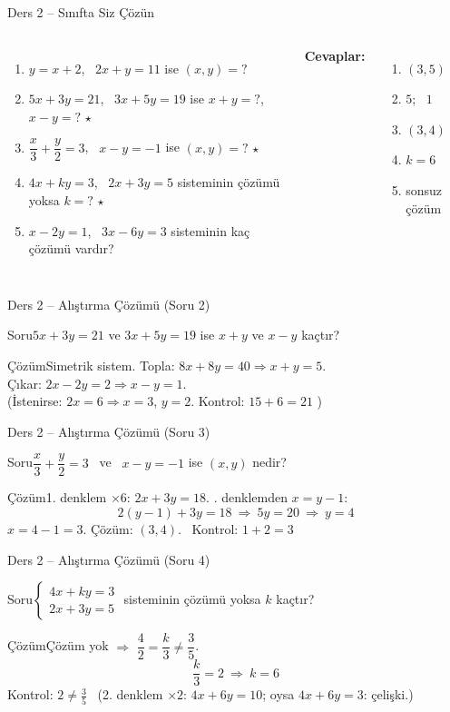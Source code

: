 \documentclass[aspectratio=169,11pt]{beamer}
\newcommand{\soru}[3]{%
\begin{frame}{#1}
  \begin{block}{Soru}\large #2\end{block}
  \pause
  \begin{exampleblock}{Çözüm}\large #3\end{exampleblock}
\end{frame}}
\begin{document}
\begin{frame}{Ders 2 -- Sınıfta Siz Çözün}
\begin{columns}[t]
\begin{enumerate}
\item \(y=x+2\), \ \(2x+y=11\) ise \((x,y)=?\)
\item \(5x+3y=21\), \ \(3x+5y=19\) ise \(x+y=?\), \ \(x-y=?\) \(\star\)
\item \(\dfrac{x}{3}+\dfrac{y}{2}=3\), \ \(x-y=-1\) ise \((x,y)=?\) \(\star\)
\item \(4x+ky=3\), \ \(2x+3y=5\) sisteminin çözümü yoksa \(k=?\) \(\star\)
\item \(x-2y=1\), \ \(3x-6y=3\) sisteminin kaç çözümü vardır?
\end{enumerate}
\pause
\textbf{Cevaplar:}
\begin{enumerate}
\item \((3,5)\)
\item \(5\); \ \(1\)
\item \((3,4)\)
\item \(k=6\)
\item sonsuz çözüm
\end{enumerate}
\end{columns}
\vspace{4pt}{\footnotesize \(\star\) işaretli soruların adım adım çözümü sonraki slaytlardadır.}
\end{frame}

\soru{Ders 2 -- Alıştırma Çözümü (Soru 2)}
{\(5x+3y=21\) ve \(3x+5y=19\) ise \(x+y\) ve \(x-y\) kaçtır?}
{Simetrik sistem. Topla: \(8x+8y=40\Rightarrow x+y=5\).\\[3pt]
Çıkar: \(2x-2y=2\Rightarrow x-y=1\).\\[3pt]
(İstenirse: \(2x=6\Rightarrow x=3\), \(y=2\). Kontrol: \(15+6=21\) \checkmark)}

\soru{Ders 2 -- Alıştırma Çözümü (Soru 3)}
{\(\dfrac{x}{3}+\dfrac{y}{2}=3\) \ ve \ \(x-y=-1\) ise \((x,y)\) nedir?}
{1. denklem \(\times 6\): \(2x+3y=18\). \quad 2. denklemden \(x=y-1\):
\[2(y-1)+3y=18\ \Rightarrow\ 5y=20\ \Rightarrow\ y=4\]
\(x=4-1=3\). \quad Çözüm: \((3,4)\). \ Kontrol: \(1+2=3\) \checkmark}

\soru{Ders 2 -- Alıştırma Çözümü (Soru 4)}
{\(\begin{cases}4x+ky=3\\ 2x+3y=5\end{cases}\) \quad sisteminin çözümü yoksa \(k\) kaçtır?}
{Çözüm yok \(\Rightarrow\) \(\dfrac{4}{2}=\dfrac{k}{3}\neq\dfrac{3}{5}\).
\[\frac{k}{3}=2\ \Rightarrow\ k=6\]
Kontrol: \(2\neq\frac35\) \checkmark \ (2. denklem \(\times 2\): \(4x+6y=10\); oysa \(4x+6y=3\): çelişki.)}
\end{document}
